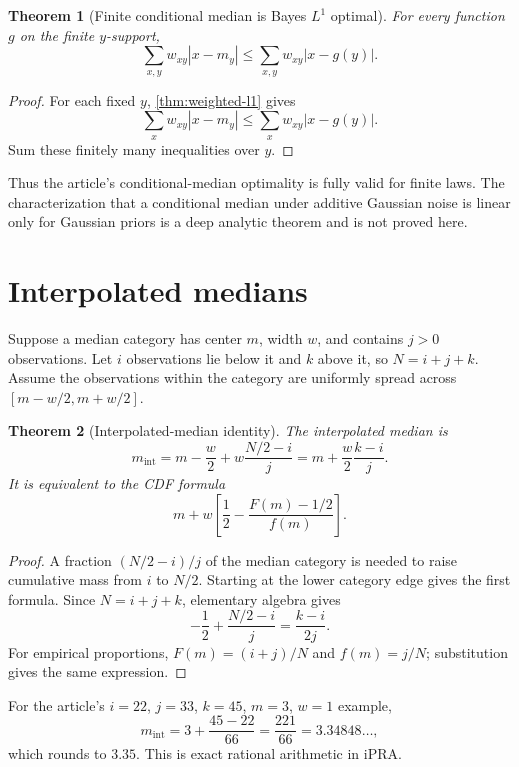 \documentclass[11pt]{article}
\newtheorem{theorem}{Theorem}[section]
\newcommand{\iPRA}{\ensuremath{\mathrm{iPRA}}}
\newcommand{\abs}[1]{\left|#1\right|}
\begin{document}
\begin{theorem}[Finite conditional median is Bayes $L^1$ optimal]\label{thm:conditional}
For every function $g$ on the finite $y$-support,
\[
 \sum_{x,y}w_{xy}\abs{x-m_y}
 \leq
 \sum_{x,y}w_{xy}\abs{x-g(y)}.
\]
\end{theorem}

\begin{proof}
For each fixed $y$, \cref{thm:weighted-l1} gives
\[
 \sum_xw_{xy}\abs{x-m_y}
 \leq\sum_xw_{xy}\abs{x-g(y)}.
\]
Sum these finitely many inequalities over $y$.
\end{proof}

Thus the article's conditional-median optimality is fully valid for finite
laws.  The characterization that a conditional median under additive Gaussian
noise is linear only for Gaussian priors is a deep analytic theorem and is not
proved here.

\section{Interpolated medians}

Suppose a median category has center $m$, width $w$, and contains $j>0$
observations.  Let $i$ observations lie below it and $k$ above it, so
$N=i+j+k$.  Assume the observations within the category are uniformly spread
across $[m-w/2,m+w/2]$.

\begin{theorem}[Interpolated-median identity]\label{thm:interpolated}
The interpolated median is
\[
 m_{\mathrm{int}}
 =m-\frac w2+w\frac{N/2-i}{j}
 =m+\frac w2\frac{k-i}{j}.
\]
It is equivalent to the CDF formula
\[
 m+w\left[\frac12-\frac{F(m)-1/2}{f(m)}\right].
\]
\end{theorem}

\begin{proof}
A fraction $(N/2-i)/j$ of the median category is needed to raise cumulative
mass from $i$ to $N/2$.  Starting at the lower category edge gives the first
formula.  Since $N=i+j+k$, elementary algebra gives
\[
 -\frac12+\frac{N/2-i}{j}=\frac{k-i}{2j}.
\]
For empirical proportions, $F(m)=(i+j)/N$ and $f(m)=j/N$; substitution gives
the same expression.
\end{proof}

For the article's $i=22$, $j=33$, $k=45$, $m=3$, $w=1$ example,
\[
 m_{\mathrm{int}}=3+\frac{45-22}{66}=\frac{221}{66}
 =3.34848\ldots,
\]
which rounds to $3.35$.  This is exact rational arithmetic in \iPRA.
\end{document}
